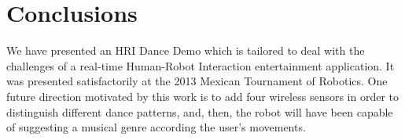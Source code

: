 \chapter{Conclusions}


We have presented an HRI Dance Demo 
which is tailored to deal with the challenges of a real-time Human-Robot Interaction entertainment application.
It was presented satisfactorily at the 2013 Mexican Tournament of Robotics.
One future direction motivated by this work 
is to add four wireless sensors in order 
to distinguish different dance patterns, and, then, 
the robot will have been capable of suggesting a musical genre according the 
user's movements.

